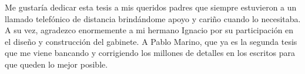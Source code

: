 
\begin{acknowledgements}      


Me gustaría dedicar esta tesis a mis queridos padres que siempre estuvieron a un llamado telefónico de distancia brindándome apoyo y cariño cuando lo necesitaba. A su vez, agradezco enormemente a mi hermano Ignacio por su participación en el diseño y construcción del gabinete. A Pablo Marino, que ya es la segunda tesis que me viene bancando y corrigiendo los millones de detalles en los escritos para que queden lo mejor posible.


\end{acknowledgements}

